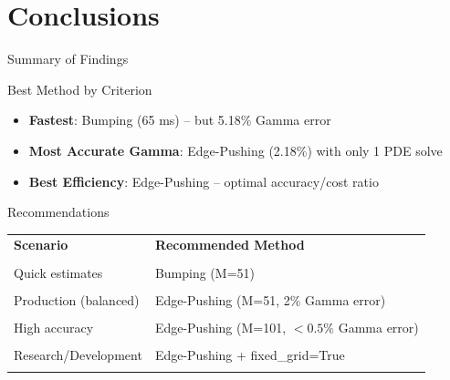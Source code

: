 \documentclass[aspectratio=169]{beamer}
\begin{document}
\section{Conclusions}

\begin{frame}{Summary of Findings}
\begin{block}{Best Method by Criterion}
\begin{itemize}
    \item \textbf{Fastest}: Bumping (65 ms) -- but 5.18\% Gamma error
    \item \textbf{Most Accurate Gamma}: Edge-Pushing (2.18\%) with only 1 PDE solve
    \item \textbf{Best Efficiency}: Edge-Pushing -- optimal accuracy/cost ratio
\end{itemize}
\end{block}

\vspace{0.5em}
\begin{block}{Recommendations}
\begin{tabular}{ll}
\toprule
\textbf{Scenario} & \textbf{Recommended Method} \\\\
\midrule
Quick estimates & Bumping (M=51) \\\\
Production (balanced) & Edge-Pushing (M=51, 2\% Gamma error) \\\\
High accuracy & Edge-Pushing (M=101, $<0.5\%$ Gamma error) \\\\
Research/Development & Edge-Pushing + fixed\_grid=True \\\\
\bottomrule
\end{tabular}
\end{block}
\end{frame}
\end{document}
